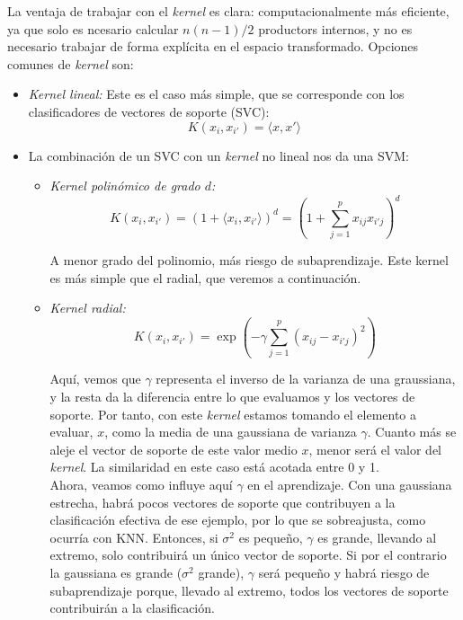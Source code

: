 La ventaja de trabajar con el \textit{kernel} es clara: computacionalmente más eficiente, ya que solo es ncesario calcular $n(n-1)/2$ productors internos, y no es necesario trabajar de forma explícita en el espacio transformado. Opciones comunes de \textit{kernel} son:
\begin{itemize}
\item \textit{Kernel lineal:} Este es el caso más simple, que se corresponde con los clasificadores de vectores de soporte (SVC):
\begin{equation}
K(x_i, x_{i'}) = \langle x, x' \rangle
\end{equation}
\item La combinación de un SVC con un \textit{kernel} no lineal nos da una SVM: 
\begin{itemize}
\item \textit{Kernel polinómico de grado $d$:} 
\begin{equation}
K(x_i, x_{i'}) = (1 + \langle x_i, x_{i'} \rangle)^d = \left(1 + \sum_{j = 1}^p x_{ij} x_{i'j}\right)^d
\end{equation}

A menor grado del polinomio, más riesgo de subaprendizaje. Este kernel es más simple que el radial, que veremos a continuación.
\item \textit{Kernel radial:}
\begin{equation}
K(x_i, x_{i'}) = \exp \left( - \gamma \sum_{j = 1}^p (x_{ij} - x_{i'j})^2 \right)
\end{equation}

Aquí, vemos que $\gamma$ representa el inverso de la varianza de una graussiana, y la resta da la diferencia entre lo que evaluamos y los vectores de soporte. Por tanto, con este \textit{kernel} estamos tomando el elemento a evaluar, $x$, como la media de una gaussiana de varianza $\gamma$. Cuanto más se aleje el vector de soporte de este valor medio $x$, menor será el valor del \textit{kernel}. La similaridad en este caso está acotada entre 0 y 1. \\

Ahora, veamos como influye aquí $\gamma$ en el aprendizaje. Con una gaussiana estrecha, habrá pocos vectores de soporte que contribuyen a la clasificación efectiva de ese ejemplo, por lo que se sobreajusta, como ocurría con KNN. Entonces, si $\sigma^2$ es pequeño, $\gamma$ es grande, llevando al extremo, solo contribuirá un único vector de soporte. Si por el contrario la gaussiana es grande ($\sigma^2$ grande), $\gamma$ será pequeño y habrá riesgo de subaprendizaje porque, llevado al extremo, todos los vectores de soporte contribuirán a la clasificación.
\end{itemize}
\end{itemize}

